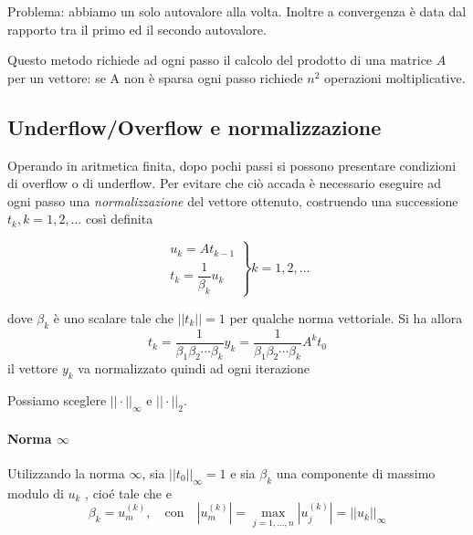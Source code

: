 Problema: abbiamo un solo autovalore alla volta. Inoltre a convergenza
\`e data dal rapporto tra il primo ed il secondo autovalore.

Questo metodo richiede ad ogni passo il calcolo del prodotto di una
matrice $A$ per un vettore: se A non è sparsa ogni passo richiede $n^2$
operazioni moltiplicative.


\subsection{Underflow/Overflow e normalizzazione}
Operando in aritmetica finita, dopo pochi passi si
possono presentare condizioni di overflow o di underflow.
Per evitare che ci\`o accada \`e necessario eseguire ad ogni passo una
\emph{normalizzazione} del vettore ottenuto, costruendo una successione
 $t_k , k = 1, 2, \ldots $ cos\`i definita

\begin{equation}
  \label{eigenvalues:05}
\left.
\begin{array}{l}
u_k = A t_{k-1} \\
t_k = \dfrac{1}{\beta_k}u_k
\end{array}
\right\}
k=1,2,\ldots
\end{equation}

dove $\beta_k$ \`e uno scalare tale che $||t_k|| = 1$ per qualche norma vettoriale.
Si ha allora
$$t_k = \dfrac{1}{\beta_1 \beta_2 \cdots \beta_k}y_k =
\dfrac{1}{\beta_1 \beta_2 \cdots \beta_k}A^{k}t_0
$$
il vettore $y_k$ va normalizzato quindi ad ogni iterazione

Possiamo sceglere $||\cdot||_{\infty}$ e  $||\cdot||_{2}$.
\paragraph{Norma $\infty$}
Utilizzando la norma $\infty$, sia $||t_0||_{\infty} = 1$ e sia
$\beta_k$ una componente di massimo modulo di $u_k$ , cio\'e tale che
e
$$
\beta_k = u_{m}^{(k)}, \quad \text{con} \quad
|u_m^{(k)}| = \max_{j=1, \ldots,n} |u_j^{(k)}| = ||u_k||_{\infty}
$$

